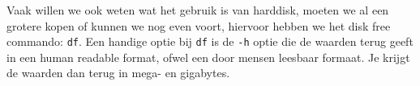 Vaak willen we ook weten wat het gebruik is van harddisk, moeten we al een grotere kopen of kunnen we nog even voort, hiervoor hebben we het disk free commando: \texttt{df}. Een handige optie bij \texttt{df} is de \texttt{-h} optie die de waarden terug geeft in een human readable format, ofwel een door mensen leesbaar formaat. Je krijgt de waarden dan terug in mega- en gigabytes.
